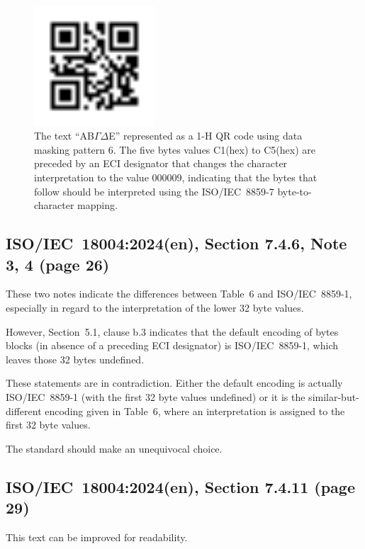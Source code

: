 \documentclass[a4paper,twoside]{article}
\newcommand{\shortstandard}{ISO/IEC~18004}
\newcommand{\standard}{\shortstandard:2024(en)}
\newcommand{\hex}[1]{#1(hex)}
\begin{document}
\begin{figure}[h]
\centering
\includegraphics[width=0.4\textwidth]{images/qrcode_iso18004_2024_QRCodeSymbol_1Mp6.png}
\caption{The text ``AB$\mathit{\Gamma\Delta}$E'' represented as a 1-H QR code using data masking pattern 6.
         The five bytes values \hex{C1} to \hex{C5} are preceded by an ECI designator that changes the character
         interpretation to the value 000009, indicating that the bytes that follow should be interpreted using
         the ISO/IEC~8859-7 byte-to-character mapping.}
\label{fig:greek-encoding}
\end{figure}

\subsection{\standard, Section 7.4.6, Note 3, 4 (page 26)}

These two notes indicate the differences between Table~6 and ISO/IEC~8859-1, especially in
regard to the interpretation of  the lower 32 byte values.

However, Section~5.1, clause b.3 indicates that the default encoding of bytes blocks
(in absence of a preceding ECI designator) is ISO/IEC~8859-1, which leaves those 32 bytes
undefined.

These statements are in contradiction. Either the default encoding is actually ISO/IEC~8859-1
(with the first 32 byte values undefined) or it is the similar-but-different encoding given
in Table~6, where an interpretation is assigned to the first 32 byte values.

The standard should make an unequivocal choice.

\subsection{\standard, Section 7.4.11 (page 29)}

This text can be improved for readability.
\end{document}

